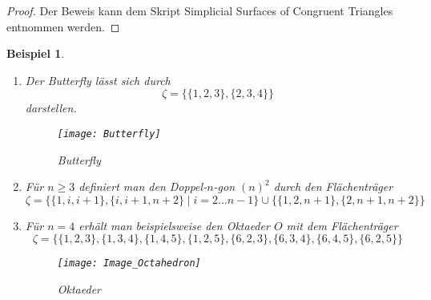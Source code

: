 \documentclass[12pt,titlepage,twoside,cleardoublepage]{article}
\theoremstyle{nummermitklammern}
\newtheorem{bsp}[temp]{Beispiel}
\newtheorem{bsp}[zahl]{Beispiel}
\numberwithin{equation}{section}
\begin{document}
\begin{proof}
Der Beweis kann dem Skript Simplicial Surfaces of Congruent Triangles entnommen werden.
\begin{comment}
Man muss nachweisen, dass $S(\xi)$ die Axiome in \Cref{def1} erfüllt.
\begin{itemize}
\item Das es zu jeder Kante genau zwei Ecken gibt, die inzident zu dieser sind, ist klar, denn zu einer 2-elementigen gibt es genau zwei 1-elementigen Teilmengen.
\item Da es zu einer 3-elementigen Menge genau drei 1-elementigen Teilmengen gibt, gibt es in $\mathcal{S}$ zu jeder Fläche genau drei Knoten. 
\item Eine Kante ist durch die Mengeninklusion inzident zu mindestens einen Fläche und durch obige Definition eines Flächenträgers erhält man, dass eine Kante zu höchstens zwei Flächen inzident ist. 
\item Die Anordnung der Flächen einer Ecke in einem Schirm wird in Definition 4.3 verlangt und ist somit klarerweise erfüllt.
\end{itemize}
\end{comment}
\end{proof}
\begin{bsp} \label{bspO}
\begin{enumerate}
Der Flächenträger 
\[
\zeta=\{\{1,2,3\},\{1,3,4\},\{1,2,4\},\{2,3,4\}\}
\]
bildet eine getragene simpliziale Fläche, die zum Tetraeder isomorph ist.
\item Der Butterfly lässt sich durch 
\[
\zeta =\{\{1,2,3\},\{2,3,4\}\}
\] darstellen.
\begin{figure}[H]
\begin{center}
\texttt{[image: Butterfly]}
\end{center}
\caption{Butterfly}
\end{figure}
\item 

Für $n\geq 3$ definiert man den Doppel-$n$-gon $(n)^2$ durch den Flächenträger  
\[
\zeta=\{\{1,i,i+1\},\{i,i+1,n+2\}\mid i=2\ldots n-1\}\cup \{\{1,2,n+1\},\{2,n+1,n+2\}\}
\]  
\item
Für $n=4$ erhält man beispielsweise den Oktaeder $O$ mit dem  Flächenträger
\[
\zeta=\{\{1,2,3\},\{1,3,4\},\{1,4,5\},\{1,2,5\},\{6,2,3\},\{6,3,4\},\{6,4,5\},\{6,2,5\}\}
\]
\begin{figure}[H]
\begin{center}
\texttt{[image: Image\_Octahedron]}
\end{center}
\caption{Oktaeder}
\end{figure} 
\end{enumerate}
\end{bsp}
\end{document}
